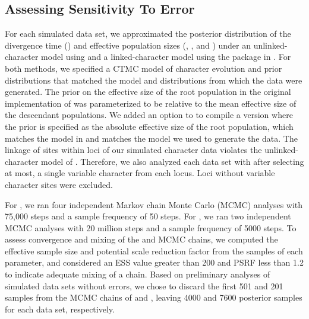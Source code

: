 \subsection{Assessing Sensitivity To Error}
For each simulated data set, we approximated the posterior distribution of the 
divergence time (\divtime) and effective population sizes (\rootpopsize, \tippopsize[1], and \tippopsize[2])
under an unlinked-character model using \ecoevolity
\citep[Version 0.3.2; dev branch commit a7e9bf2;][]{Oaks2018ecoevolity}
and a linked-character model using the \beast
\citep[Version 0.15.1;][]{ogilvieStarBEAST2BringsFaster2017} package in \beastcore
\citep[Version 2.5.2;][]{bouckaertBEASTSoftwarePlatform2014}.
For both methods, we specified a CTMC model of character evolution and prior
distributions that matched the model and distributions from which the data were
generated. The prior on the effective size of the root population in the original
implementation of \ecoevolity was parameterized to be relative to the mean
effective size of the descendant populations.
We added an option to \ecoevolity to compile a version where the prior is
specified as the absolute effective size of the root population,
which matches the model in \beast and matches the model we used to generate the data.
The linkage of sites within loci of our simulated character data violates the 
unlinked-character model of \ecoevolity \citep{bryantInferringSpeciesTrees2012,Oaks2018ecoevolity}. Therefore, we also analyzed each data 
set with \ecoevolity after selecting at most, a single variable character from 
each locus. Loci without variable character sites were excluded. 

For \ecoevolity, we ran four independent Markov chain Monte Carlo (MCMC)
analyses with 75,000 steps and a sample frequency of 50 steps.
For \beast, we ran two independent MCMC analyses with 20 million steps and a
sample frequency of 5000 steps. 
To assess convergence and mixing of the \ecoevolity and \beast MCMC chains, we
computed the effective sample size
\citep[ESS;][]{Gong2014}
and potential scale reduction factor
\citep[PSRF; the square root of Equation 1.1 in][]{Brooks1998}
from the samples of each parameter, and considered an ESS value greater
than 200 and PSRF less than 1.2 \citep{gelman1998} to indicate adequate mixing
of a chain. 
Based on preliminary analyses of simulated data sets without errors,
we chose to discard the first 501 and 201 samples from
the MCMC chains of \ecoevolity and \beast, leaving 4000 and
7600 posterior samples for each data set, respectively.


